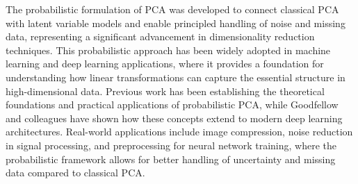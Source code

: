 The probabilistic formulation of PCA was developed to connect classical PCA with latent variable models and enable principled handling of noise and missing data, representing a significant advancement in dimensionality reduction techniques. This probabilistic approach has been widely adopted in machine learning and deep learning applications, where it provides a foundation for understanding how linear transformations can capture the essential structure in high-dimensional data. Previous work has been establishing the theoretical foundations and practical applications of probabilistic PCA, while Goodfellow and colleagues have shown how these concepts extend to modern deep learning architectures. Real-world applications include image compression, noise reduction in signal processing, and preprocessing for neural network training, where the probabilistic framework allows for better handling of uncertainty and missing data compared to classical PCA.
